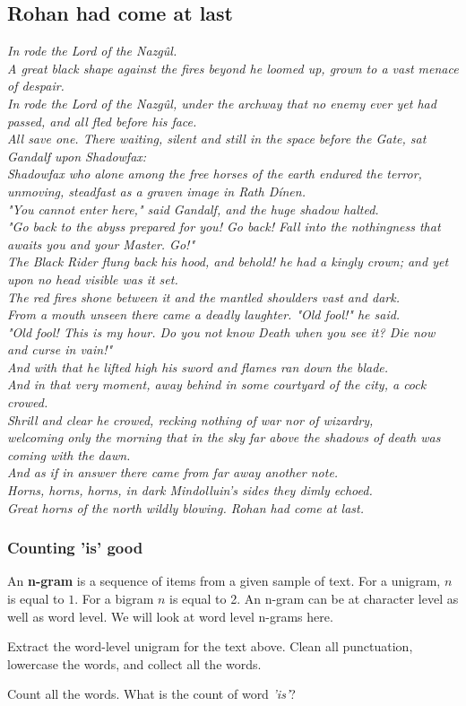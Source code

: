 \documentclass[a4paper]{article}
\begin{document}
\subsection{Rohan had come at last}
\textit{In rode the Lord of the Nazgûl. \\
A great black shape against the fires beyond he loomed up, grown to a vast menace of despair. \\
In rode the Lord of the Nazgûl, under the archway that no enemy ever yet had passed, and all fled before his face. \\
All save one. There waiting, silent and still in the space before the Gate, sat Gandalf upon Shadowfax: \\
Shadowfax who alone among the free horses of the earth endured the terror, \\
unmoving, steadfast as a graven image in Rath Dínen. \\
"You cannot enter here," said Gandalf, and the huge shadow halted. \\
"Go back to the abyss prepared for you! Go back! Fall into the nothingness that awaits you and your Master. Go!" \\
The Black Rider flung back his hood, and behold! he had a kingly crown; and yet upon no head visible was it set. \\
The red fires shone between it and the mantled shoulders vast and dark. \\
From a mouth unseen there came a deadly laughter. "Old fool!" he said. \\
"Old fool! This is my hour. Do you not know Death when you see it? Die now and curse in vain!" \\ And with that he lifted high his sword and flames ran down the blade. \\
And in that very moment, away behind in some courtyard of the city, a cock crowed. \\
Shrill and clear he crowed, recking nothing of war nor of wizardry, \\
welcoming only the morning that in the sky far above the shadows of death was coming with the dawn. \\
And as if in answer there came from far away another note. \\
Horns, horns, horns, in dark Mindolluin's sides they dimly echoed. \\
Great horns of the north wildly blowing. Rohan had come at last.}

\subsubsection{Counting 'is' good}
An \textbf{n-gram} is a sequence of items from a given sample of text. For a unigram, $n$ is equal to $1$. For a bigram $n$ is equal to 2. An n-gram can be at character level as well as word level. We will look at word level n-grams here.
\par
Extract the word-level unigram for the text above. Clean all punctuation, lowercase the words, and collect all the words.
\par
Count all the words. What is the count of word \textit{'is'}?
\end{document}
